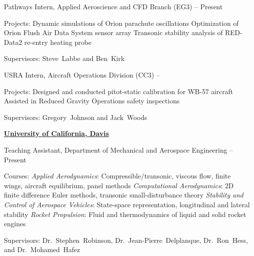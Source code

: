 \documentclass[letterpaper,MMMyyyy,nonstop]{simpleresumecv}
\begin{document}
\begin{body}
\GapNoBreak
\BulletItem
Pathways Intern, Applied Aeroscience and CFD Branch (EG3)
\hfill
{} --
Present
\begin{detail}
\SubItem
Projects:
\SubBulletItem
Dynamic simulations of Orion parachute oscillations
\SubBulletItem
Optimization of Orion Flush Air Data System sensor array
\SubBulletItem
Transonic stability analysis of RED-Data2 re-entry heating probe

\SubItem
Supervisors:
Steve~Labbe and
Ben~Kirk
\end{detail}

\GapNoBreak
\BulletItem
USRA Intern, Aircraft Operations Division (CC3)
\hfill
{} --
\begin{detail}
\SubItem
Projects:
\SubBulletItem
Designed and conducted pitot-static calibration for WB-57 aircraft
\SubBulletItem
Assisted in Reduced Gravity Operations safety inspections

\SubItem
Supervisors:
Gregory~Johnson and
Jack~Woods
\end{detail}


\Gap

\href{http://mae.ucdavis.edu/}
{\textbf{University of California, Davis}}

\GapNoBreak
\BulletItem
Teaching Assistant, Department of Mechanical and Aerospace Engineering
\hfill
{} --
Present
\begin{detail}
\SubItem
Courses:
\SubBulletItem
\emph{Applied Aerodynamics}:  Compressible/transonic, viscous flow, finite wings, aircraft equilibrium, panel methods
\SubBulletItem
\emph{Computational Aerodynamics}:  2D finite difference Euler methods, transonic small-disturbance theory
\SubBulletItem
\emph{Stability and Control of Aerospace Vehicles}:  State-space representation, longitudinal and lateral stability
\SubBulletItem
\emph{Rocket Propulsion}:  Fluid and thermodynamics of liquid and solid rocket engines

\SubItem
Supervisors:
Dr.~Stephen~Robinson,
Dr.~Jean-Pierre~Delplanque,
Dr.~Ron~Hess, and
Dr.~Mohamed~Hafez


\end{detail}






\end{body}
\end{document}

